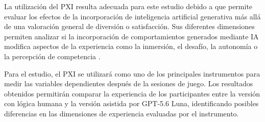 La utilización del PXI resulta adecuada para este estudio debido a que permite evaluar los efectos de la incorporación de inteligencia artificial generativa más allá de una valoración general de diversión o satisfacción. Sus diferentes dimensiones permiten analizar si la incorporación de comportamientos generados mediante IA modifica aspectos de la experiencia como la inmersión, el desafío, la autonomía o la percepción de competencia \cite{vermeeren2019pxi}.

Para el estudio, el PXI se utilizará como uno de los principales instrumentos para medir las variables dependientes después de la sesiones de juego. Los resultados obtenidos permitirán comparar la experiencia de los participantes entre la versión con lógica humana y la versión asistida por GPT-5.6 Luna, identificando posibles diferencias en las dimensiones de experiencia evaluadas por el instrumento.